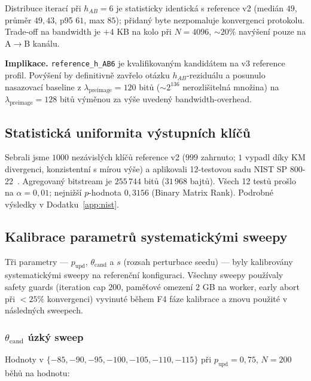 \documentclass[11pt,a4paper]{article}
\begin{document}
Distribuce iterací při $h_{AB} = 6$ je statisticky identická s reference v2 (medián $49$, průměr $49{,}43$, p95 $61$, max $85$); přidaný byte nezpomaluje konvergenci protokolu. Trade-off na bandwidth je $+4$ KB na kolo při $N = 4096$, $\sim 20\%$ navýšení pouze na A$\to$B kanálu.

\textbf{Implikace.} \texttt{reference\_h\_AB6} je kvalifikovaným kandidátem na v3 reference profil. Povýšení by definitivně zavřelo otázku $h_{AB}$-reziduálu a posunulo nasazovací baseline z $\lambda_\text{preimage} = 120$ bitů ($\sim 2^{136}$ nerozlišitelná množina) na $\lambda_\text{preimage} = 128$ bitů výměnou za výše uvedený bandwidth-overhead.

\subsection{Statistická uniformita výstupních klíčů}\label{sec:empirical-nist}

Sebrali jsme $1000$ nezávislých klíčů reference v2 ($999$ zahrnuto; $1$ vypadl díky KM divergenci, konzistentní s mírou výše) a aplikovali 12-testovou sadu NIST SP 800-22~\cite{NIST800-22}. Agregovaný bitstream je $255\,744$ bitů ($31\,968$ bajtů). Všech 12 testů prošlo na $\alpha = 0{,}01$; nejnižší $p$-hodnota $0{,}3156$ (Binary Matrix Rank). Podrobné výsledky v Dodatku~\ref{app:nist}.

\subsection{Kalibrace parametrů systematickými sweepy}\label{sec:empirical-calibration}

Tři parametry --- $p_\text{upd}$, $\theta_\text{cand}$ a $s$ (rozsah perturbace seedu) --- byly kalibrovány systematickými sweepy na referenční konfiguraci. Všechny sweepy používaly safety guards (iteration cap $200$, paměťové omezení $2$ GB na worker, early abort při $< 25\%$ konvergenci) vyvinuté během F4 fáze kalibrace a znovu použité v následných sweepech.

\subsubsection{$\theta_\text{cand}$ úzký sweep}\label{sec:empirical-cand}

Hodnoty v $\{-85, -90, -95, -100, -105, -110, -115\}$ při $p_\text{upd} = 0{,}75$, $N = 200$ běhů na hodnotu:
\end{document}
